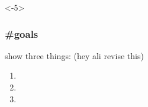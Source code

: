\documentclass[presentation]{subfiles}
\begin{document}
\begin{frame}<-5>\frametitle{\#goals}
show three things: (hey ali revise this)

\begin{enumerate}
  \item<-3> \firstthesis{}
  \item<-5> \secondthesis{}
  \item<-4,6> \thirdthesis{}
\end{enumerate}
\end{frame}
\end{document}
